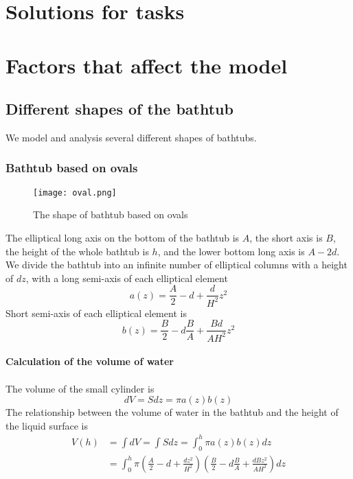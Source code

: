 \documentclass{mcmthesis}
\begin{document}
\section{Solutions for tasks}
\section{Factors that affect the model}
\subsection{Different shapes of the bathtub}
We model and analysis several different shapes of bathtubs.
\subsubsection{Bathtub based on ovals}
\begin{figure}[H]
\centerline{\texttt{[image: oval.png]}}
\caption{The shape of bathtub based on ovals}
\label{oval}	
\end{figure}
The elliptical long axis on the bottom of the bathtub is $A$, the short axis is $B$, the height of the whole bathtub is $h$, and the lower bottom long axis is $A-2d$.\\
\indent We divide the bathtub into an infinite number of elliptical columns with a height of $dz$, with a long semi-axis of each elliptical element\\
\begin{equation}
a(z)=\frac{A}{2}-d+\frac{d}{{H}^{2}}{z}^{2}
\end{equation}
\indent Short semi-axis of each elliptical element is
\begin{equation}
b(z)=\frac{B}{2}-d\frac{B}{A}+\frac{Bd}{A{H}^{2}}{z}^{2}
\end{equation}\\
\textbf{Calculation of the volume of water} \\\\
\indent The volume of the small cylinder is
\begin{equation}
dV=Sdz=\pi a(z)b(z)
\end{equation}
\indent The relationship between the volume of water in the bathtub and the height of the liquid surface is
\begin{equation}
\begin{split}
V(h)&=\int dV=\int Sdz=\int_{0}^{h}\pi a(z)b(z)dz \\
&=\int_{0}^{h}\pi(\frac{A}{2}-d+\frac{d{z}^{2}}{{H}^{2}})(\frac{B}{2}-d\frac{B}{A}+\frac{dB{z}^{2}}{A{H}^{2}})dz
\label{V}
\end{split}
\end{equation}
\end{document}
